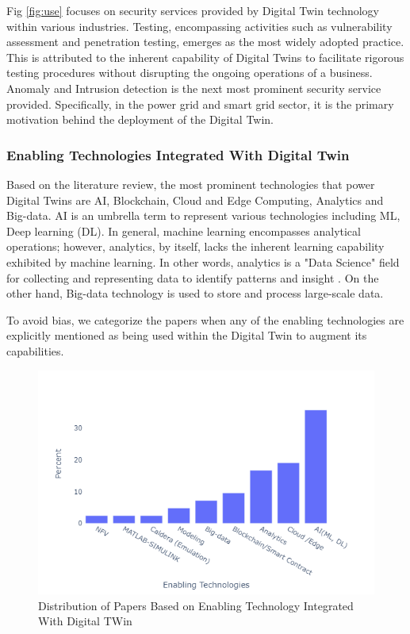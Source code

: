 Fig \ref{fig:use} focuses on security services provided by Digital Twin technology within various industries. Testing, encompassing activities such as vulnerability assessment and penetration testing, emerges as the most widely adopted practice. This is attributed to the inherent capability of Digital Twins to facilitate rigorous testing procedures without disrupting the ongoing operations of a business.  Anomaly and Intrusion detection is the next most prominent security service provided. Specifically, in the power grid and smart grid sector, it is the primary motivation behind the deployment of the Digital Twin.


\subsubsection*{Enabling Technologies Integrated With Digital Twin }

Based on the literature review, the most prominent technologies that power Digital Twins are AI, Blockchain, Cloud and Edge Computing, Analytics and Big-data. AI is an umbrella term to represent various technologies including ML, Deep learning (DL). In general, machine learning encompasses analytical operations; however, analytics, by itself, lacks the inherent learning capability exhibited by machine learning. In other words, analytics is a "Data Science" field for collecting and representing data to identify patterns and insight \cite{fuller_digital_2020}. On the other hand, Big-data technology is used to store and process large-scale data. 

To avoid bias, we categorize the papers when any of the enabling technologies are explicitly mentioned as being used within the Digital Twin to augment its capabilities.  

\begin{figure}[H]  
    {
        \centering
        \includegraphics[width=1\textwidth]{images/rt/dt-enablingtech.png}
        \caption{Distribution of Papers Based on Enabling Technology Integrated With Digital TWin}
        \label{fig:enable}
    }
\end{figure}

